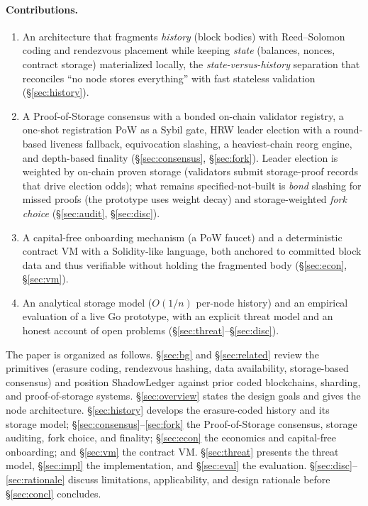 \paragraph{Contributions.}
\begin{enumerate}
  \item An architecture that fragments \emph{history} (block bodies) with Reed--Solomon coding
  and rendezvous placement while keeping \emph{state} (balances, nonces, contract storage)
  materialized locally, the \emph{state-versus-history} separation that reconciles ``no node
  stores everything'' with fast stateless validation (\S\ref{sec:history}).
  \item A Proof-of-Storage consensus with a bonded on-chain validator registry, a one-shot
  registration PoW as a Sybil gate, HRW leader election with a round-based liveness fallback,
  equivocation slashing, a heaviest-chain reorg engine, and depth-based finality
  (\S\ref{sec:consensus}, \S\ref{sec:fork}). Leader election is weighted by
  on-chain proven storage (validators submit storage-proof records that drive election odds); what
  remains specified-not-built is \emph{bond} slashing for missed proofs (the prototype uses weight
  decay) and storage-weighted \emph{fork choice} (\S\ref{sec:audit}, \S\ref{sec:disc}).
  \item A capital-free onboarding mechanism (a PoW faucet) and a deterministic contract VM with
  a Solidity-like language, both anchored to committed block data and thus verifiable without
  holding the fragmented body (\S\ref{sec:econ}, \S\ref{sec:vm}).
  \item An analytical storage model ($O(1/n)$ per-node history) and an empirical evaluation of a
  live Go prototype, with an explicit threat model and an honest account of open problems
  (\S\ref{sec:threat}--\S\ref{sec:disc}).
\end{enumerate}

The paper is organized as follows. \S\ref{sec:bg} and \S\ref{sec:related} review the primitives
(erasure coding, rendezvous hashing, data availability, storage-based consensus) and position
ShadowLedger against prior coded blockchains, sharding, and proof-of-storage systems.
\S\ref{sec:overview} states the design goals and gives the node architecture. \S\ref{sec:history}
develops the erasure-coded history and its storage model; \S\ref{sec:consensus}--\ref{sec:fork}
the Proof-of-Storage consensus, storage auditing, fork choice, and finality; \S\ref{sec:econ} the
economics and capital-free onboarding; and \S\ref{sec:vm} the contract VM. \S\ref{sec:threat}
presents the threat model, \S\ref{sec:impl} the implementation, and \S\ref{sec:eval} the
evaluation. \S\ref{sec:disc}--\ref{sec:rationale} discuss limitations, applicability, and design
rationale before \S\ref{sec:concl} concludes.
